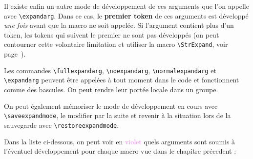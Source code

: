 \documentclass[a4paper,10pt,french]{article}
\begin{document}
Il existe enfin un autre mode de développement de ces arguments que l'on appelle avec \verb|\expandarg|. Dans ce cas, le \textbf{premier token} de ces arguments est développé \emph{une fois} avant que la macro ne soit appelée. Si l'argument contient plus d'un token, les tokens qui suivent le premier ne sont pas développés (on peut contourner cette volontaire limitation et utiliser la macro \verb|\StrExpand|, voir page~\pageref{scancs}).\medskip

Les commandes \verb|\fullexpandarg|, \verb|\noexpandarg|, \verb|\normalexpandarg| et \verb|\expandarg| peuvent être appelées à tout moment dans le code et fonctionnent comme des bascules. On peut rendre leur portée locale dans un groupe.\medskip

On peut également mémoriser le mode de développement en cours avec \verb|\saveexpandmode|, le modifier par la suite et revenir à la situation lors de la sauvegarde avec \verb|\restoreexpandmode|.\medskip

Dans la liste ci-dessous, on peut voir en \textcolor{violet}{violet} quels arguments sont soumis à l'éventuel développement pour chaque macro vue dans le chapitre précedent :\smallskip
\end{document}
